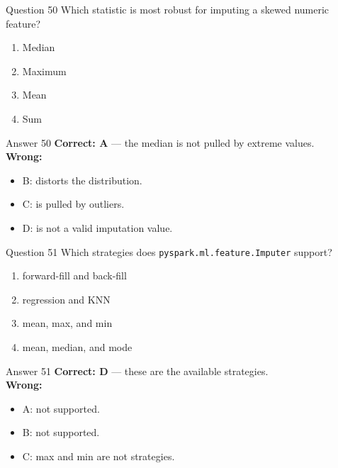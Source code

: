 \documentclass[aspectratio=169,11pt]{beamer}
\begin{document}
	\begin{frame}{Question 50}
		Which statistic is most robust for imputing a skewed numeric feature?
		\begin{enumerate}[label=\Alph*.]
			\item Median
			\item Maximum
			\item Mean
			\item Sum
		\end{enumerate}
	\end{frame}
	\begin{frame}{Answer 50}
		\textbf{Correct: A} --- the median is not pulled by extreme values.\\
		\vspace{0.5em}
		\textbf{Wrong:}
		\begin{itemize}
			\item B: distorts the distribution.
			\item C: is pulled by outliers.
			\item D: is not a valid imputation value.
		\end{itemize}
	\end{frame}
	
	\begin{frame}{Question 51}
		Which strategies does \texttt{pyspark.ml.feature.Imputer} support?
		\begin{enumerate}[label=\Alph*.]
			\item forward-fill and back-fill
			\item regression and KNN
			\item mean, max, and min
			\item mean, median, and mode
		\end{enumerate}
	\end{frame}
	\begin{frame}{Answer 51}
		\textbf{Correct: D} --- these are the available strategies.\\
		\vspace{0.5em}
		\textbf{Wrong:}
		\begin{itemize}
			\item A: not supported.
			\item B: not supported.
			\item C: max and min are not strategies.
		\end{itemize}
	\end{frame}
	
\end{document}
